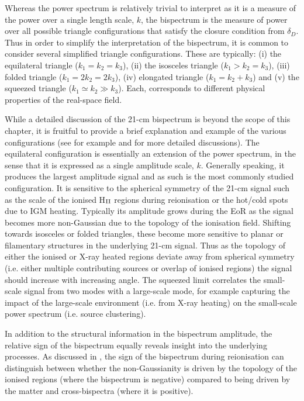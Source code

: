 Whereas the power spectrum is relatively trivial to interpret as it is a measure of the power over a single length scale, $k$, the bispectrum is the measure of power over all possible triangle configurations that satisfy the closure condition from $\delta_{D}$. Thus in order to simplify the interpretation of the bispectrum, it is common to consider several simplified triangle configurations. These are typically: (i) the equilateral triangle ($k_{1}  = k_{2} = k_{3}$), (ii) the isosceles triangle ($k_{1} > k_{2} = k_{3}$), (iii) folded triangle ($k_{1} = 2k_{2} = 2k_{3}$), (iv) elongated triangle ($k_{1} = k_{2} + k_{3}$) and (v) the squeezed triangle ($k_{1} \simeq k_{2} \gg k_{3}$). Each, corresponds to different physical properties of the real-space field.

While a detailed discussion of the 21-cm bispectrum is beyond the scope of this chapter, it is fruitful to provide a brief explanation and example of the various configurations (see for example \cite{Lewis:2011} and \cite{Watkinson:2019} for more detailed discussions). The equilateral configuration is essentially an extension of the power spectrum, in the sense that it is expressed as a single amplitude scale, $k$. Generally speaking, it produces the largest amplitude signal and as such is the most commonly studied configuration. It is sensitive to the spherical symmetry of the 21-cm signal such as the scale of the ionised H$_{\rm \scriptstyle II}$ regions during reionisation or the hot/cold spots due to IGM heating. Typically its amplitude grows during the EoR as the signal becomes more non-Gaussian due to the topology of the ionisation field. Shifting towards isosceles or folded triangles, these become more sensitive to planar or filamentary structures in the underlying 21-cm signal. Thus as the topology of either the ionised or X-ray heated regions deviate away from spherical symmetry (i.e. either multiple contributing sources or overlap of ionised regions) the signal should increase with increasing angle. The squeezed limit correlates the small-scale signal from two modes with a large-scale mode, for example capturing the impact of the large-scale environment (i.e. from X-ray heating) on the small-scale power spectrum (i.e. source clustering).

In addition to the structural information in the bispectrum amplitude, the relative sign of the bispectrum equally reveals insight into the underlying processes. As discussed in \cite{Majumdar:2018}, the sign of the bispectrum during reionisation can distinguish between whether the non-Gaussianity is driven by the topology of the ionised regions (where the bispectrum is negative) compared to being driven by the matter and cross-bispectra (where it is positive).


